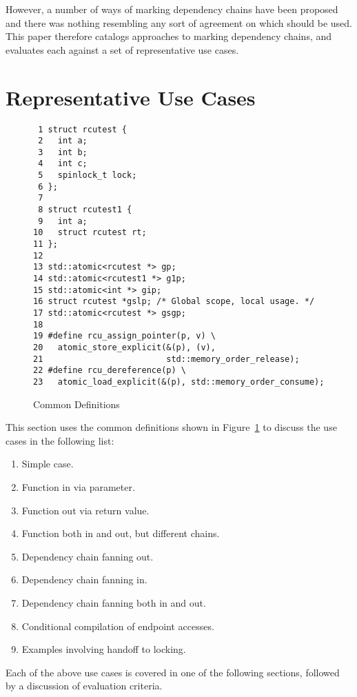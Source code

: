 \documentclass[letterpaper,twocolumn,10pt]{article}
\begin{document}
However, a number of ways of marking dependency chains have been
proposed and there was nothing resembling any sort of agreement
on which should be used.
This paper therefore catalogs approaches to marking dependency chains,
and evaluates each against a set of representative use cases.

\section{Representative Use Cases}
\label{sec:Representative Use Cases}

\begin{figure}[tbp]
{ \scriptsize
\begin{verbatim}
 1 struct rcutest {
 2   int a;
 3   int b;
 4   int c;
 5   spinlock_t lock;
 6 };
 7
 8 struct rcutest1 {
 9   int a;
10   struct rcutest rt;
11 };
12
13 std::atomic<rcutest *> gp;
14 std::atomic<rcutest1 *> g1p;
15 std::atomic<int *> gip;
16 struct rcutest *gslp; /* Global scope, local usage. */
17 std::atomic<rcutest *> gsgp;
18
19 #define rcu_assign_pointer(p, v) \
20   atomic_store_explicit(&(p), (v),
21                         std::memory_order_release);
22 #define rcu_dereference(p) \
23   atomic_load_explicit(&(p), std::memory_order_consume);
\end{verbatim}
}
\caption{Common Definitions}
\label{fig:Common Definitions}
\end{figure}

This section uses the common definitions shown in
Figure~\ref{fig:Common Definitions}
to discuss the use cases in the following list:

\begin{enumerate}
\item	Simple case.
\item	Function in via parameter.
\item	Function out via return value.
\item	Function both in and out, but different chains.
\item	Dependency chain fanning out.
\item	Dependency chain fanning in.
\item	Dependency chain fanning both in and out.
\item	Conditional compilation of endpoint accesses.
\item	Examples involving handoff to locking.
\end{enumerate}

Each of the above use cases is covered in one of the following sections,
followed by a discussion of evaluation criteria.
\end{document}
